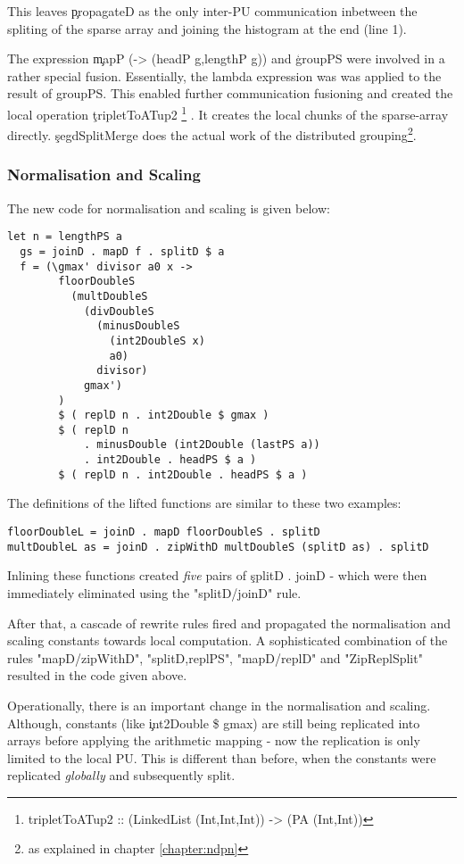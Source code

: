       This leaves \c{propagateD} as the only inter-PU communication inbetween the spliting of the
      sparse array and joining the histogram at the end (line 1).
      
      The expression \c{mapP (\g -> (headP g,lengthP g))} and \c{groupPS}
      were involved in a rather special fusion. Essentially, the lambda expression was
      was applied to the result of groupPS. This enabled further communication
      fusioning and created the local operation \c{tripletToATup2}
      \footnote{tripletToATup2 :: (LinkedList (Int,Int,Int)) -> (PA (Int,Int))}
      . It creates the
      local chunks of the sparse-array directly. \c{segdSplitMerge} does the
      actual work of the distributed grouping\footnote{as explained in chapter \ref{chapter:ndpn}}.
      
    \subsubsection{Normalisation and Scaling}
    The new code for normalisation and scaling is given below:
    \begin{lstlisting}
let n = lengthPS a
  gs = joinD . mapD f . splitD $ a
  f = (\gmax' divisor a0 x ->
        floorDoubleS
          (multDoubleS
            (divDoubleS
              (minusDoubleS
                (int2DoubleS x)
                a0)
              divisor)
            gmax')
        )
        $ ( replD n . int2Double $ gmax )
        $ ( replD n
            . minusDouble (int2Double (lastPS a))
            . int2Double . headPS $ a )
        $ ( replD n . int2Double . headPS $ a )
    \end{lstlisting}
    The definitions of the lifted functions are similar to these two examples:
    \begin{lstlisting}
floorDoubleL = joinD . mapD floorDoubleS . splitD
multDoubleL as = joinD . zipWithD multDoubleS (splitD as) . splitD
    \end{lstlisting}
    Inlining these functions created \emph{five} pairs of \c{splitD . joinD} - which were then immediately
    eliminated using the "splitD/joinD" rule.
    
    After that, a cascade of rewrite rules fired and propagated the normalisation and scaling
    constants towards local computation. A sophisticated combination of the rules
    "mapD/zipWithD", "splitD,replPS", "mapD/replD" and "ZipReplSplit" resulted in
    the code given above.
    
    Operationally, there is an important change in the normalisation and scaling.
    Although, constants (like \c{int2Double \$ gmax}) are still being replicated into arrays
    before applying the arithmetic mapping - now the replication
    is only limited to the local PU. This is different than before, when
    the constants were replicated \emph{globally} and subsequently split.
    
